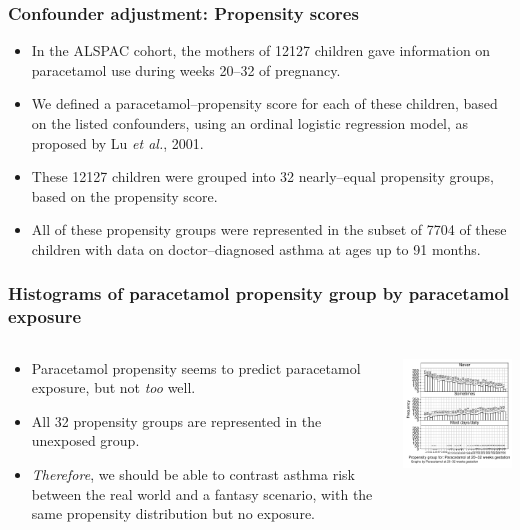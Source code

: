 \documentclass[11pt]{beamer}
\begin{document}
\begin{frame}
\frametitle{Confounder adjustment: Propensity scores}

\begin{itemize}

\item<2-> In the ALSPAC cohort, the mothers of 12127 children gave information on paracetamol use
during weeks 20--32 of pregnancy.

\item<3-> We defined a paracetamol--propensity score for each of these children,
based on the listed confounders,
using an ordinal logistic regression model,
as proposed by Lu \textit{et al.}, 2001\cite{lu2001}.

\item<4-> These 12127 children were grouped into 32 nearly--equal propensity groups,
based on the propensity score.

\item<5-> All of these propensity groups were represented
in the subset of 7704 of these children
with data on doctor--diagnosed asthma at ages up to 91 months.

\end{itemize}

\end{frame}

\begin{frame}
\frametitle{Histograms of paracetamol propensity group by paracetamol exposure}

\begin{columns}[t]
\begin{column}{48mm}
\begin{itemize}
\item<2-> Paracetamol propensity seems to predict paracetamol exposure,
but not \textit{too} well.
\item<3-> All 32 propensity groups are represented in the unexposed group.
\item<4-> \textit{Therefore}, we should be able to contrast asthma risk
between the real world and a fantasy scenario,
with the same propensity distribution but no exposure.
\end{itemize}
\end{column}
\begin{column}[T]{80mm}
\includegraphics[width=76mm]{figseq1.pdf}
\end{column}
\end{columns}

\end{frame}
\end{document}
